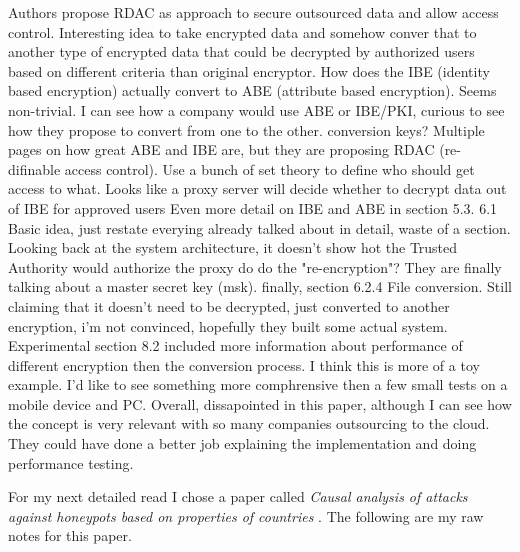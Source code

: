 \documentclass[conference]{IEEEtran}
\begin{document}
Authors propose RDAC as approach to secure outsourced data and allow access control. Interesting idea to take encrypted data and somehow conver that to another type of encrypted data that could be decrypted by authorized users based on different criteria than original encryptor.
How does the IBE (identity based encryption) actually convert to ABE (attribute based encryption). 
Seems non-trivial.
I can see how a company would use ABE or IBE/PKI, curious to see how they propose to convert from one to the other. 
conversion keys? Multiple pages on how great ABE and IBE are, but they are proposing RDAC (re-difinable access control). Use a bunch of set theory to define who should get access to what.
Looks like a proxy server will decide whether to decrypt data out of IBE for approved users
Even more detail on IBE and ABE in section 5.3.
6.1 Basic idea, just restate everying already talked about in detail, waste of a section.
Looking back at the system architecture, it doesn't show hot the Trusted Authority would authorize the proxy do do the "re-encryption"?
They are finally talking about a master secret key (msk). 
finally, section 6.2.4 File conversion.
Still claiming that it doesn't need to be decrypted, just converted to another encryption, i'm not convinced, hopefully they built some actual system.
Experimental section 8.2 included more information about performance of different encryption then the conversion process. 
I think this is more of a toy example. I'd like to see something more comphrensive then a few small tests on a mobile device and PC.
Overall, dissapointed in this paper, although I can see how the concept is very relevant with so many companies outsourcing to the cloud. 
They could have done a better job explaining the implementation and doing performance testing.


For my next detailed read I chose a paper called  \textit{Causal analysis of attacks against honeypots based on properties of countries} \cite{zuzcak_causal_2019}. The following are my raw notes for this paper.
\end{document}

